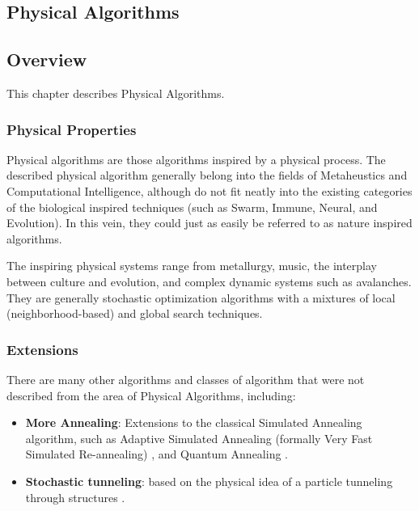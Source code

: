 

\renewcommand{\bibsection}{\subsection{\bibname}}
\begin{bibunit}

\chapter{Physical Algorithms}
\label{ch:physical}

\section{Overview}
This chapter describes Physical Algorithms.


\subsection{Physical Properties}
Physical algorithms are those algorithms inspired by a physical process. The described physical algorithm generally belong into the fields of Metaheustics and Computational Intelligence, although do not fit neatly into the existing categories of the biological inspired techniques (such as Swarm, Immune, Neural, and Evolution). In this vein, they could just as easily be referred to as nature inspired algorithms.

The inspiring physical systems range from metallurgy, music, the interplay between culture and evolution, and complex dynamic systems such as avalanches. They are generally stochastic optimization algorithms with a mixtures of local (neighborhood-based) and global search techniques.

% 
% 
\subsection{Extensions}
\label{sec:extensions}
There are many other algorithms and classes of algorithm that were not described from the area of Physical Algorithms, including:

\begin{itemize}
	\item \textbf{More Annealing}: Extensions to the classical Simulated Annealing algorithm, such as Adaptive Simulated Annealing (formally Very Fast Simulated Re-annealing) \cite{Ingber1989, Ingber1996}, and Quantum Annealing \cite{Apolloni1989, Das2005}.
	\item \textbf{Stochastic tunneling}: based on the physical idea of a particle tunneling through structures \cite{Wenzel1999}.
\end{itemize}

\putbib
\end{bibunit}


